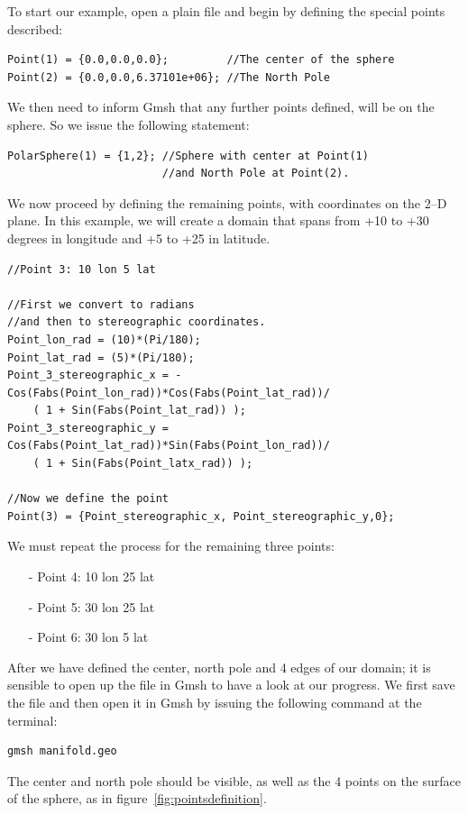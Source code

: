 To start our example, open a plain file and begin by defining the special points described:
\begin{lstlisting}
Point(1) = {0.0,0.0,0.0};         //The center of the sphere
Point(2) = {0.0,0.0,6.37101e+06}; //The North Pole
\end{lstlisting}
We then need to inform Gmsh that any further points defined, will be on the sphere. So we issue the following statement:
\begin{lstlisting}
PolarSphere(1) = {1,2}; //Sphere with center at Point(1)
                        //and North Pole at Point(2).
\end{lstlisting}

We now proceed by defining the remaining points, with coordinates on the 2--D plane. In this example, we will create a domain that spans from +10 to +30 degrees in longitude and +5 to +25 in latitude.

\begin{lstlisting}
//Point 3: 10 lon 5 lat

//First we convert to radians
//and then to stereographic coordinates.
Point_lon_rad = (10)*(Pi/180);
Point_lat_rad = (5)*(Pi/180);
Point_3_stereographic_x = -Cos(Fabs(Point_lon_rad))*Cos(Fabs(Point_lat_rad))/
    ( 1 + Sin(Fabs(Point_lat_rad)) );
Point_3_stereographic_y = Cos(Fabs(Point_lat_rad))*Sin(Fabs(Point_lon_rad))/
    ( 1 + Sin(Fabs(Point_latx_rad)) );

//Now we define the point
Point(3) = {Point_stereographic_x, Point_stereographic_y,0};
\end{lstlisting}

We must repeat the process for the remaining three points:
\begin{itemize}
\item[-] Point 4: 10 lon 25 lat
\item[-] Point 5: 30 lon 25 lat
\item[-] Point 6: 30 lon 5 lat
\end{itemize}

After we have defined the center, north pole and 4 edges of our domain; it is sensible to open up the file in Gmsh to have a look at our progress. We first save the file and then open it in Gmsh by issuing the following command at the terminal:
\begin{lstlisting}
gmsh manifold.geo
\end{lstlisting}
The center and north pole should be visible, as well as the 4 points on the surface of the sphere, as in figure~\ref{fig:pointsdefinition}.

